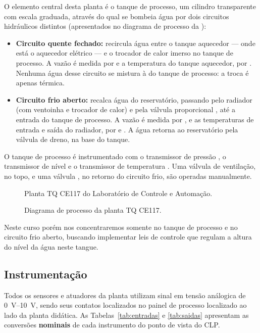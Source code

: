 O elemento central desta planta é o tanque de processo, um cilindro transparente com escala graduada, através do qual se bombeia água por dois circuitos hidráulicos distintos (apresentados no diagrama de processo da ):
\begin{itemize}
  \item \textbf{Circuito quente fechado:}  recircula água entre o tanque aquecedor --- onde está o aquecedor elétrico --- e o trocador de calor imerso no tanque de processo. A vazão é medida por  e a temperatura do tanque aquecedor, por . Nenhuma água desse circuito se mistura à do tanque de processo: a troca é apenas térmica.
  \item \textbf{Circuito frio aberto:}  recalca água do reservatório, passando pelo radiador (com ventoinha e trocador de calor) e pela válvula proporcional , até a entrada do tanque de processo. A vazão é medida por , e as temperaturas de entrada e saída do radiador, por  e . A
    água retorna ao reservatório pela válvula de dreno, na base do tanque.
\end{itemize}

O tanque de processo é instrumentado com o transmissor de pressão , o transmissor de nível  e o transmissor de temperatura . Uma válvula de ventilação, no topo, e uma válvula , no retorno do circuito frio, são operadas manualmente.

\begin{figure}[H]
  \centering
  \caption{Planta TQ CE117 do Laboratório de Controle e Automação.}
  \label{fig:planta}
\end{figure}

\begin{figure}[H]
  \centering
  \caption{Diagrama de processo da planta TQ CE117.}
  \label{fig:diagrama}
\end{figure}

Neste curso porém nos concentraremos somente no tanque de processo e no circuito frio aberto, buscando implementar leis de controle que regulam a altura do nível da água neste tangue.


\subsection{Instrumentação}
Todos os sensores e atuadores da planta utilizam sinal em tensão análogica de \qtyrange{0}{10}{\volt}, sendo seus contatos localizados no painel de processo localizado ao lado da planta didática.
%
As Tabelas~\ref{tab:entradas} e \ref{tab:saidas} apresentam as conversões \textbf{nominais} de cada instrumento do ponto de vista do CLP.

